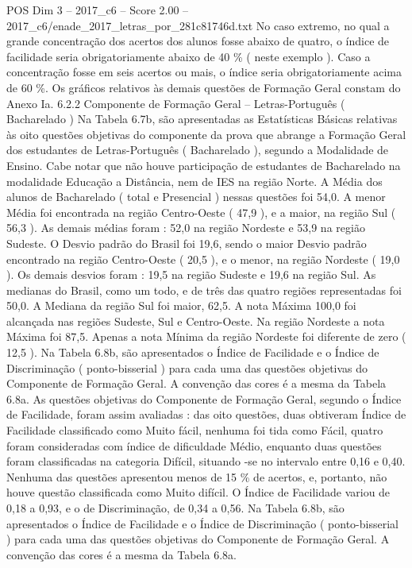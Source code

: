 \begin{textsample}{POS Dim 3 – 2017\_c6 – Score 2.00 – 2017\_c6/enade\_2017\_letras\_por\_281c81746d.txt}
No caso extremo, no qual a grande concentração dos acertos dos alunos fosse abaixo de quatro, o índice de facilidade seria obrigatoriamente abaixo de 40 \% ( neste exemplo ).
Caso a concentração fosse em seis acertos ou mais, o índice seria obrigatoriamente acima de 60 \%.
Os gráficos relativos às demais questões de Formação Geral constam do Anexo Ia. 6.2.2 Componente de Formação Geral – Letras-Português ( Bacharelado ) Na Tabela 6.7b, são apresentadas as Estatísticas Básicas relativas às oito questões objetivas do componente da prova que abrange a Formação Geral dos estudantes de Letras-Português ( Bacharelado ), segundo a Modalidade de Ensino.
Cabe notar que não houve participação de estudantes de Bacharelado na modalidade Educação a Distância, nem de IES na região Norte.
A Média dos alunos de Bacharelado ( total e Presencial ) nessas questões foi 54,0.
A menor Média foi encontrada na região Centro-Oeste ( 47,9 ), e a maior, na região Sul ( 56,3 ).
As demais médias foram : 52,0 na região Nordeste e 53,9 na região Sudeste.
O Desvio padrão do Brasil foi 19,6, sendo o maior Desvio padrão encontrado na região Centro-Oeste ( 20,5 ), e o menor, na região Nordeste ( 19,0 ).
Os demais desvios foram : 19,5 na região Sudeste e 19,6 na região Sul.
As medianas do Brasil, como um todo, e de três das quatro regiões representadas foi 50,0.
A Mediana da região Sul foi maior, 62,5.
A nota Máxima 100,0 foi alcançada nas regiões Sudeste, Sul e Centro-Oeste.
Na região Nordeste a nota Máxima foi 87,5.
Apenas a nota Mínima da região Nordeste foi diferente de zero ( 12,5 ).
Na Tabela 6.8b, são apresentados o Índice de Facilidade e o Índice de Discriminação ( ponto-bisserial ) para cada uma das questões objetivas do Componente de Formação Geral.
A convenção das cores é a mesma da Tabela 6.8a.
As questões objetivas do Componente de Formação Geral, segundo o Índice de Facilidade, foram assim avaliadas : das oito questões, duas obtiveram Índice de Facilidade classificado como Muito fácil, nenhuma foi tida como Fácil, quatro foram consideradas com índice de dificuldade Médio, enquanto duas questões foram classificadas na categoria Difícil, situando -se no intervalo entre 0,16 e 0,40.
Nenhuma das questões apresentou menos de 15 \% de acertos, e, portanto, não houve questão classificada como Muito difícil.
O Índice de Facilidade variou de 0,18 a 0,93, e o de Discriminação, de 0,34 a 0,56.
Na Tabela 6.8b, são apresentados o Índice de Facilidade e o Índice de Discriminação ( ponto-bisserial ) para cada uma das questões objetivas do Componente de Formação Geral.
A convenção das cores é a mesma da Tabela 6.8a.

\end{textsample}
